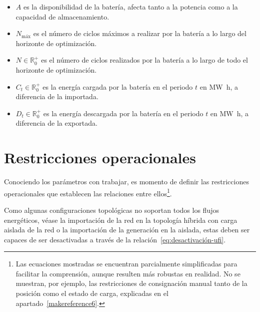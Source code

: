 \begin{itemize}
  \item \( A \) es la disponibilidad de la batería, afecta tanto a la potencia como a la capacidad de almacenamiento.

  \item \( N_{\text{máx}} \) es el número de ciclos máximos a realizar por la batería a lo largo del horizonte de optimización.

  \item \( N \in \mathbb{R}^{+}_{0} \) es el número de ciclos realizados por la batería a lo largo de todo el horizonte de optimización.

  \item \( C_{t} \in \mathbb{R}^{+}_{0} \) es la energía cargada por la batería en el periodo \( t \) en \si{{\mega\watt\hour}}, a diferencia de la importada.

  \item \( D_{t} \in \mathbb{R}^{+}_{0} \) es la energía descargada por la batería en el periodo \( t \) en \si{{\mega\watt\hour}}, a diferencia de la exportada.

\end{itemize}

\section{Restricciones operacionales}%
\label{makereference5.2}

Conociendo los parámetros con trabajar, es momento de definir las restricciones operacionales que establecen las relaciones entre ellos\footnote{Las ecuaciones mostradas se encuentran parcialmente simplificadas para facilitar la comprensión, aunque resulten más robustas en realidad. No se muestran, por ejemplo, las restricciones de consignación manual tanto de la posición como el estado de carga, explicadas en el apartado~\ref{makereference6}.}.

Como algunas configuraciones topológicas no soportan todos los flujos energéticos, véase la importación de la red en la topología híbrida con carga aislada de la red o la importación de la generación en la aislada, estas deben ser capaces de ser desactivadas a través de la relación~\ref{eq:desactivación-ufi}.

